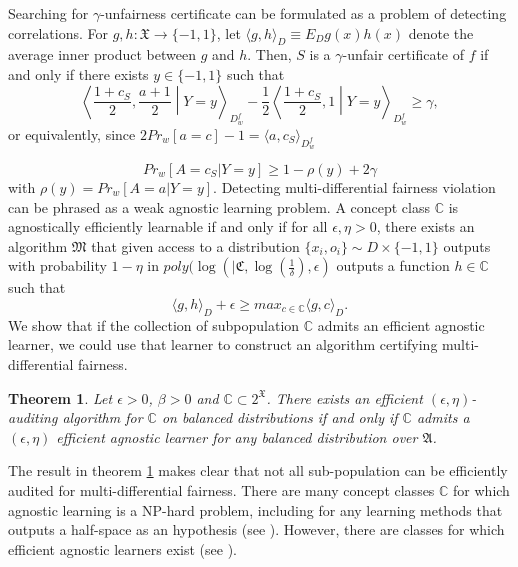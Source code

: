 \documentclass{article}
\newtheorem{thm}{Theorem}[section]
\begin{document}
Searching for $\gamma$-unfairness certificate can be formulated as a problem of detecting correlations. For $g, h:\mathfrak{X}\rightarrow \{-1, 1\}$,   let $\langle g, h\rangle_{D}\equiv E_{D}g(x)h(x)$ denote the average inner product between $g$ and $h$. Then, $S$ is a $\gamma$-unfair certificate of $f$ if and only if there exists $y\in \{-1, 1\}$ such that
\begin{equation}
    \left\langle \frac{1+c_{S}}{2}, \frac{a + 1}{2}\middle|Y=y\right\rangle_{D_{w}^{f}} -\frac{1}{2} \left\langle \frac{1+c_{S}}{2}, 1\middle |Y=y\right\rangle_{D_{w}^{f}} \geq \gamma,
\end{equation}
or equivalently, since $2Pr_{w}[a=c] - 1= \langle a, c_{S}\rangle_{D_{w}^{f}}$

\begin{equation}
Pr_{w}[A=c_{S}| Y=y] \geq 1 - \rho(y) + 2\gamma
\end{equation}
with $\rho(y)=Pr_{w}[A=a|Y=y]$. Detecting multi-differential fairness violation can be phrased as a weak agnostic learning problem. A concept class $\mathbb{C}$ is agnostically efficiently learnable if and only if for all $\epsilon, \eta >0$, there exists an algorithm $\mathfrak{M}$ that given access to a distribution $\{x_{i}, o_{i}\}\sim D\times \{-1, 1\}$ outputs with probability $1-\eta$ in $poly(\log(|\mathfrak{C}, \log(\frac{1}{\delta}), \epsilon)$ outputs  a function $h\in \mathbb{C}$ such that
$$ \langle g,h\rangle_{D} + \epsilon \geq max_{c\in \mathbb{C}}\langle g, c\rangle_{D}. $$
We show that if the collection of subpopulation $\mathbb{C}$ admits an efficient agnostic learner, we could use that learner to construct an algorithm certifying multi-differential fairness.

\begin{thm}
\label{thm: al}
Let $\epsilon > 0$, $\beta >0$ and $\mathbb{C}\subset 2^{\mathfrak{X}}$. There exists an efficient $(\epsilon, \eta)$-auditing algorithm for $\mathbb{C}$ on balanced distributions if and only if $\mathbb{C}$ admits a $( \epsilon,\eta)$ efficient agnostic learner for any balanced distribution over $\mathfrak{A}$.  
\end{thm}

The result in theorem \ref{thm: al} makes clear that not all sub-population can be efficiently audited for multi-differential fairness. There are many concept classes $\mathbb{C}$ for which agnostic learning is a NP-hard problem, including for any learning methods that outputs a half-space as an hypothesis (see \cite{feldman2012agnostic}). However, there are classes for which efficient agnostic learners exist (see \cite{kearns1994toward}).
\end{document}
